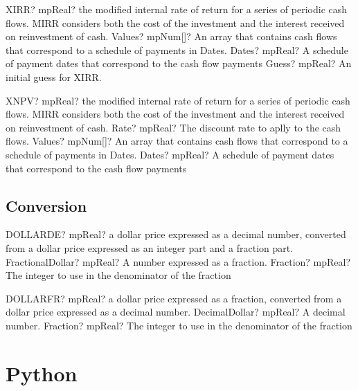 \documentclass[12pt,a4paper,openany]{book}
\begin{document}
\begin{mpFunctionsExtract}
\mpWorksheetFunctionThreeNotImplemented
{XIRR? mpReal? the modified internal rate of return for a series of periodic cash flows. MIRR considers both the cost of the investment and the interest received on reinvestment of cash.}
{Values? mpNum[]? An array that contains cash flows that correspond to a schedule of payments in Dates.}
{Dates? mpReal? A schedule of payment dates that correspond to the cash flow payments}
{Guess? mpReal? An initial guess for XIRR.}
\end{mpFunctionsExtract}

\begin{mpFunctionsExtract}
\mpWorksheetFunctionThreeNotImplemented
{XNPV? mpReal? the modified internal rate of return for a series of periodic cash flows. MIRR considers both the cost of the investment and the interest received on reinvestment of cash.}
{Rate? mpReal? The discount rate to aplly to the cash flows.}
{Values? mpNum[]? An array that contains cash flows that correspond to a schedule of payments in Dates.}
{Dates? mpReal? A schedule of payment dates that correspond to the cash flow payments}
\end{mpFunctionsExtract}

\section{Conversion}

\begin{mpFunctionsExtract}
\mpWorksheetFunctionTwoNotImplemented
{DOLLARDE? mpReal? a dollar price expressed as a decimal number, converted from a dollar price expressed as an integer part and a fraction part.}
{FractionalDollar? mpReal? A number expressed as a fraction.}
{Fraction? mpReal? The integer to use in the denominator of the fraction}
\end{mpFunctionsExtract}

\begin{mpFunctionsExtract}
\mpWorksheetFunctionTwoNotImplemented
{DOLLARFR? mpReal?  a dollar price expressed as a fraction, converted from a dollar price expressed as a decimal number.}
{DecimalDollar? mpReal? A decimal number.}
{Fraction? mpReal? The integer to use in the denominator of the fraction}
\end{mpFunctionsExtract}

\chapter{Python}
\end{document}
